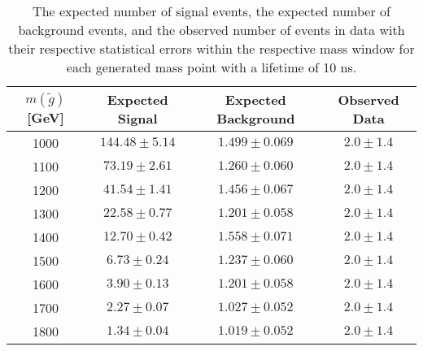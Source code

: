 \begin{table}[!htbp]
  \begin{center}
    \begin{tabular}{cccc}
      \hline
      $m(\tilde{g})$ [GeV]  & Expected Signal & Expected Background & Observed Data\\ 
      \hline
      1000    & $144.48 \pm 5.14 $ & $1.499 \pm 0.069 $ & $2.0 \pm 1.4$ \\
      1100    & $73.19 \pm 2.61 $ & $1.260 \pm 0.060 $ & $2.0 \pm 1.4$ \\
      1200    & $41.54 \pm 1.41 $ & $1.456 \pm 0.067 $ & $2.0 \pm 1.4$ \\
      1300    & $22.58 \pm 0.77 $ & $1.201 \pm 0.058 $ & $2.0 \pm 1.4$ \\
      1400    & $12.70 \pm 0.42 $ & $1.558 \pm 0.071 $ & $2.0 \pm 1.4$ \\
      1500    & $6.73 \pm 0.24 $ & $1.237 \pm 0.060 $ & $2.0 \pm 1.4$ \\
      1600    & $3.90 \pm 0.13 $ & $1.201 \pm 0.058 $ & $2.0 \pm 1.4$ \\
      1700    & $2.27 \pm 0.07 $ & $1.027 \pm 0.052 $ & $2.0 \pm 1.4$ \\
      1800    & $1.34 \pm 0.04 $ & $1.019 \pm 0.052 $ & $2.0 \pm 1.4$ \\
      \hline
    \end{tabular}
  \end{center}
  \caption{The expected number of signal events, the expected number of background events, and the observed number of events in data with their respective statistical errors within the respective mass window for each generated mass point with a lifetime of 10 ns.}
  \label{tab:app_counts_10ns}
\end{table}


